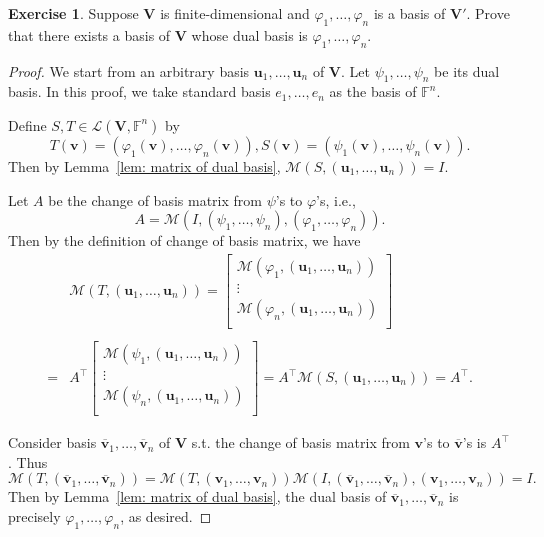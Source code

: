 \documentclass{tufte-handout}
\def \v {\vspace{0.2cm}}
\theoremstyle{plain} %
\theoremstyle{definition}
\newtheorem{exer}[thm]{Exercise}
\theoremstyle{remark}
\newcommand{\bra}[1]{\mathopen{}\left(#1\right)}
\renewcommand{\phi}{\varphi}
\newcommand{\F}{\mathbb{F}}
\newcommand{\mL}{\mathcal{L}}
\newcommand{\mM}{\mathcal{M}}
\newcommand{\V}{\bm{V}}
\renewcommand{\u}{\bm{u}}
\renewcommand{\v}{\bm{v}}
\begin{document}
\begin{exer}
	Suppose $\V$ is finite-dimensional and $\phi_1,\dots,\phi_n$ is a basis of $\V'$. Prove that there exists a basis of $\V$ whose dual basis is $\phi_1,\dots,\phi_n$.
\end{exer}
\begin{proof}
	We start from an arbitrary basis $\u_1,\dots,\u_n$ of $\V$. Let $\psi_1,\dots,\psi_n$ be its dual basis. In this proof, we take standard basis $e_1,\dots,e_n$ as the basis of $\F^n$.
	
	Define $S,T\in\mL\bra{\V,\F^n}$ by
	\[T(\v)=\bra{\phi_1(\v),\dots,\phi_n(\v)},S(\v)=\bra{\psi_1(\v),\dots,\psi_n(\v)}.\]
	Then by Lemma~\ref{lem: matrix of dual basis}, $\mM\bra{S,\bra{\u_1,\dots,\u_n}}=I$.
	
	Let $A$ be the change of basis matrix from $\psi$'s to $\phi$'s, i.e.,
	\[A=\mM\bra{I,\bra{\psi_1,\dots,\psi_n},\bra{\phi_1,\dots,\phi_n}}.\]
	Then by the definition of change of basis matrix, we have
	\begin{align*}
		&\mM\bra{T,\bra{\u_1,\dots,\u_n}}=\begin{bmatrix}
			\mM\bra{\phi_1,\bra{\u_1,\dots,\u_n}}\\
			\vdots\\
			\mM\bra{\phi_n,\bra{\u_1,\dots,\u_n}}\\
		\end{bmatrix}\\\\
		=&A^\intercal\begin{bmatrix}
			\mM\bra{\psi_1,\bra{\u_1,\dots,\u_n}}\\
			\vdots\\
			\mM\bra{\psi_n,\bra{\u_1,\dots,\u_n}}\\
		\end{bmatrix}=A^\intercal\mM\bra{S,\bra{\u_1,\dots,\u_n}}=A^\intercal.
	\end{align*}\vspace{0em}

	Consider basis $\overline{\v}_1,\dots,\overline{\v}_n$ of $\V$ s.t. the change of basis matrix from $\v$'s to $\overline{\v}$'s is $A^\intercal$. Thus
	\[\mM\bra{T,\bra{\overline{\v}_1,\dots,\overline{\v}_n}}=\mM\bra{T,\bra{\v_1,\dots,\v_n}}\mM\bra{I,\bra{\overline{\v}_1,\dots,\overline{\v}_n},\bra{\v_1,\dots,\v_n}}=I.\]
	Then by Lemma~\ref{lem: matrix of dual basis}, the dual basis of $\overline{\v}_1,\dots,\overline{\v}_n$ is precisely $\phi_1,\dots,\phi_n$, as desired.
\end{proof}
\end{document}
